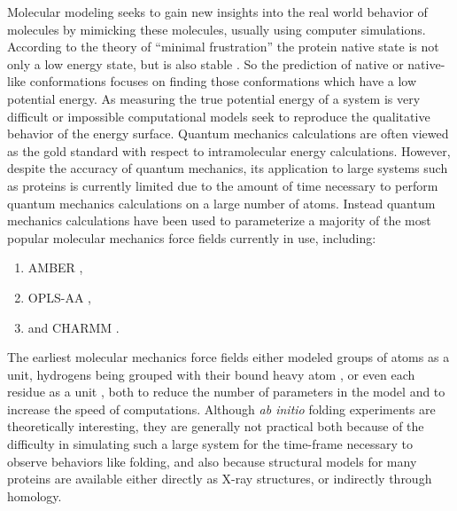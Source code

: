 Molecular modeling seeks to gain new insights into the real world behavior of molecules by mimicking these molecules, usually using computer simulations.
According to the theory of ``minimal frustration'' the protein native state is not only a low energy state, but is also stable \cite{bryngelson1987spin}.
So the prediction of native or native-like conformations focuses on finding those conformations which have a low potential energy.
As measuring the true potential energy of a system is very difficult or impossible computational models seek to reproduce the qualitative behavior of the energy surface.
Quantum mechanics calculations are often viewed as the gold standard with respect to intramolecular energy calculations.
However, despite the accuracy of quantum mechanics, its application to large systems such as proteins is currently limited due to the amount of time necessary to perform quantum mechanics calculations on a large number of atoms.
Instead quantum mechanics calculations have been used to parameterize a majority of the most popular molecular mechanics force fields currently in use, including:
\begin{enumerate}
\item AMBER \cite{weiner1984new},
\item OPLS-AA \cite{kaminski1994free},
\item and CHARMM \cite{mackerell2002charmm}.
\end{enumerate}

The earliest molecular mechanics force fields either modeled groups of atoms as a unit, hydrogens being grouped with their bound heavy atom \cite{jorgensen1988opls}, or even each residue as a unit \cite{lee1999energy}, both to reduce the number of parameters in the model and to increase the speed of computations.
Although {\it ab initio} folding experiments are theoretically interesting, they are generally not practical both because of the difficulty in simulating such a large system for the time-frame necessary to observe behaviors like folding, and also because structural models for many proteins are available either directly as X-ray structures, or indirectly through homology.

